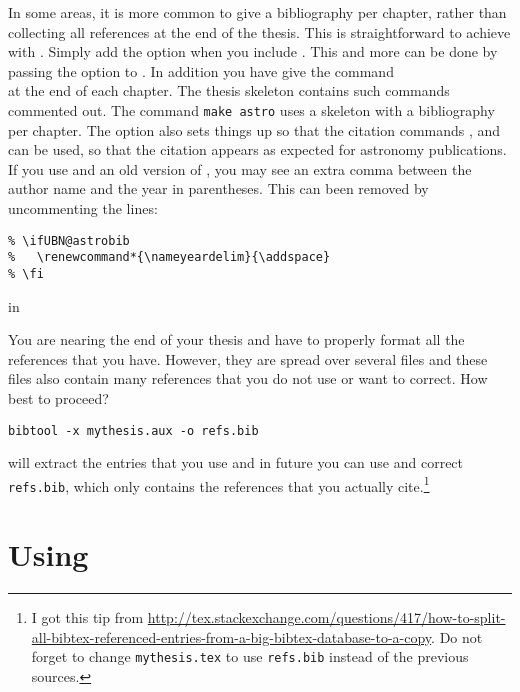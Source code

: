 In some areas, it is more common to give a bibliography per chapter,
rather than collecting all references at the end of the thesis.
This is straightforward to achieve with .
Simply add the option  when you include .
This and more can be done by passing the option  to .
In addition you have give the command\\
 at the end of each chapter.
The thesis skeleton contains such commands commented out.
The command \texttt{make astro} uses a skeleton with a bibliography per chapter.
The option  also sets things up so that the  citation
commands ,  and  can be used,
so that the citation appears as expected for astronomy publications.
If you use  and an old version of ,
you may see an extra comma between the author name and the year in parentheses.
This can been removed by uncommenting the lines:
\begin{verbatim}
% \ifUBN@astrobib
%   \renewcommand*{\nameyeardelim}{\addspace}
% \fi
\end{verbatim}
in 

You are nearing the end of your thesis and have to properly format all
the references that you have. However, they are spread over several
files and these files also contain many references that you do not use
or want to correct. How best to proceed?
\begin{verbatim}
bibtool -x mythesis.aux -o refs.bib
\end{verbatim}
will extract the entries that you use and in future you can use and
correct \texttt{refs.bib}, which only contains the references that you
actually cite.\footnote{%
I got this tip from
\url{http://tex.stackexchange.com/questions/417/how-to-split-all-bibtex-referenced-entries-from-a-big-bibtex-database-to-a-copy}.
Do not forget to change \texttt{mythesis.tex} to use
\texttt{refs.bib} instead of the previous sources.}


\section{Using }
\label{sec:ref:mcite}

